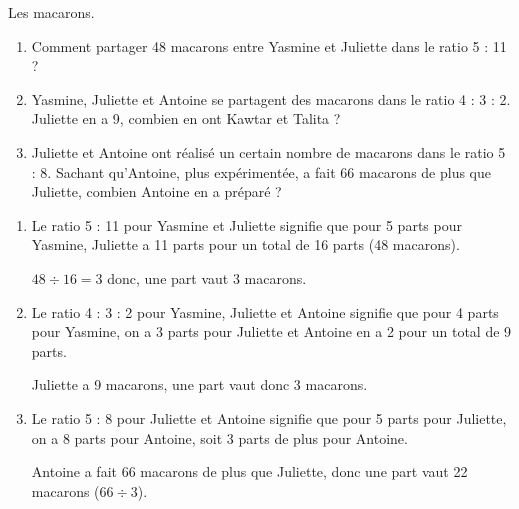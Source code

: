 \begin{Maquette}[Fiche,CorrigeFin,Colonnes=2]{}
\begin{multicols}{2}
      
      \begin{exercice}[Dur] %
         Les macarons.
         \begin{enumerate}
            \item Comment partager 48 macarons entre Yasmine et Juliette dans le ratio 5 : 11 ?
            \item Yasmine, Juliette et Antoine se partagent des macarons dans le ratio 4 : 3 : 2. Juliette en a 9, combien en ont Kawtar et Talita ?
            \item Juliette et Antoine ont réalisé un certain nombre de macarons dans le ratio 5 : 8. Sachant qu'Antoine, plus expérimentée, a fait 66 macarons de plus que Juliette, combien Antoine en a préparé ?
         \end{enumerate}
      \end{exercice}
      
      \begin{Solution}
         \begin{enumerate}
            \item Le ratio 5 : 11 pour Yasmine et Juliette signifie que pour 5 parts pour Yasmine, Juliette a 11 parts pour un total de 16 parts (48 macarons). \par
               $48\div16 =3$ donc, une part vaut 3 macarons. \par
            \item Le ratio 4 : 3 : 2 pour Yasmine, Juliette et Antoine signifie que pour 4 parts pour Yasmine, on a 3 parts pour Juliette et Antoine en a 2 pour un total de 9 parts. \par
               \qquad {} \par
               Juliette a 9 macarons, une part vaut donc 3 macarons. \par
            \item Le ratio 5 : 8 pour Juliette et Antoine signifie que pour 5 parts pour Juliette, on a 8 parts pour Antoine, soit 3 parts de plus pour Antoine. \par
               \qquad {} \par
               Antoine a fait 66 macarons de plus que Juliette, donc une part vaut 22 macarons ($66\div3$). \par
         \end{enumerate}
      \end{Solution}
      

\end{multicols}
\end{Maquette}
